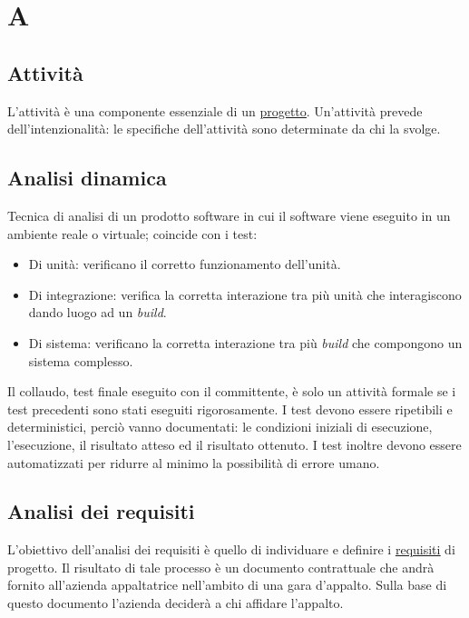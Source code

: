 





\copertina


\tableofcontents

\newpage
	\section{A}
	\subsection{Attività}
	\label{sec:attivita}
	L'attività è una componente essenziale di un \underline{\hyperref[sec:progetto]{progetto}}. Un'attività prevede dell'intenzionalità: le specifiche dell'attività sono determinate da chi la svolge. 	
	
	\subsection{Analisi dinamica}
	\label{sec:analisidinamica}
	Tecnica di analisi di un prodotto software in cui il software viene eseguito in un ambiente reale o virtuale; coincide con i test: 
	\begin{itemize}  
		\item Di unità: verificano il corretto funzionamento dell'unità.
		\item Di integrazione: verifica la corretta interazione tra più unità che interagiscono dando luogo ad un \emph{build}.
		\item Di sistema: verificano la corretta interazione tra più \emph{build} che compongono un sistema complesso.
	\end{itemize}	
	Il collaudo, test finale eseguito con il committente, è solo un attività formale se i test precedenti sono stati eseguiti rigorosamente. I test devono essere ripetibili e deterministici, perciò vanno documentati: le condizioni iniziali di esecuzione, l'esecuzione, il risultato atteso ed il risultato ottenuto. I test inoltre devono essere automatizzati per ridurre al minimo la possibilità di errore umano.
	
	\subsection{Analisi dei requisiti}
	\label{sec:analisirequisiti}
	L'obiettivo dell'analisi dei requisiti è quello di individuare e definire i \underline{\hyperref[sec:reqisito]{requisiti}} di progetto. Il risultato di tale processo è un documento contrattuale che andrà fornito all'azienda appaltatrice nell'ambito di una gara d'appalto. Sulla base di questo documento l'azienda deciderà a chi affidare l'appalto.
	
